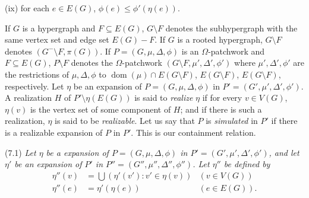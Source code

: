 \hspace*{12pt}(ix) for each $e \in E(G)$, $\phi(e) \le \phi'(\eta(e))$.

If $G$ is a hypergraph and $F \subseteq E(G)$, $G \setminus F$ denotes the subhypergraph with the same vertex set and edge set $E(G) - F$. If $G$ is a rooted hypergraph, $G \setminus F$ denotes $(G^- \setminus F, \pi(G))$. If $P = (G, \mu, \Delta, \phi)$ is an $\Omega$-patchwork and $F \subseteq E(G)$, $P \setminus F$ denotes the $\Omega$-patchwork $(G \setminus F, \mu', \Delta', \phi')$ where $\mu', \Delta', \phi'$ are the restrictions of $\mu, \Delta, \phi$ to $\operatorname{dom}(\mu) \cap E(G \setminus F)$, $E(G \setminus F)$, $E(G \setminus F)$, respectively. Let $\eta$ be an expansion of $P = (G, \mu, \Delta, \phi)$ in $P' = (G', \mu', \Delta', \phi')$. A realization $H$ of $P' \setminus \eta(E(G))$ is said to \textit{realize} $\eta$ if for every $v \in V(G)$, $\eta(v)$ is the vertex set of some component of $H$; and if there is such a realization, $\eta$ is said to be \textit{realizable}. Let us say that $P$ is \textit{simulated} in $P'$ if there is a realizable expansion of $P$ in $P'$. This is our containment relation.

\stmt
(7.1) \textit{Let $\eta$ be a expansion of $P = (G, \mu, \Delta, \phi)$ in $P' = (G', \mu', \Delta', \phi')$, and let $\eta'$ be an expansion of $P'$ in $P'' = (G'', \mu'', \Delta'', \phi'')$. Let $\eta''$ be defined by}
\begin{align*}
\eta''(v) &= \bigcup (\eta'(v') \colon v' \in \eta(v)) & (v \in V(G)) \\
\eta''(e) &= \eta'(\eta(e)) & (e \in E(G)).
\end{align*}
